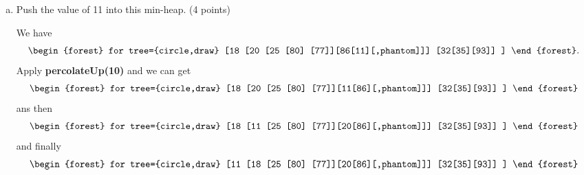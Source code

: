 \documentclass[11pt]{exam}
\begin{document}
\begin{enumerate}[a)]
    \item Push the value of 11 into this min-heap. (4 points)
          \begin{solution}
              We have \[ \begin{forest}
                      for tree={circle,draw}
                      [18
                          [20
                                  [25
                                          [80]
                                          [77]][86[11][,phantom]]]
                          [32[35][93]]
                      ]
                  \end{forest}.\]
              Apply \textbf{percolateUp(10)} and we can get \[
                  \begin{forest}
                      for tree={circle,draw}
                      [18
                          [20
                                  [25
                                          [80]
                                          [77]][11[86][,phantom]]]
                          [32[35][93]]
                      ]
                  \end{forest}\]
              ans then \[
                  \begin{forest}
                      for tree={circle,draw}
                      [18
                          [11
                                  [25
                                          [80]
                                          [77]][20[86][,phantom]]]
                          [32[35][93]]
                      ]
                  \end{forest}\]
              and finally \[
                  \begin{forest}
                      for tree={circle,draw}
                      [11
                          [18
                                  [25
                                          [80]
                                          [77]][20[86][,phantom]]]
                          [32[35][93]]
                      ]
                  \end{forest}\]
          \end{solution}


\end{enumerate}
\end{document}
